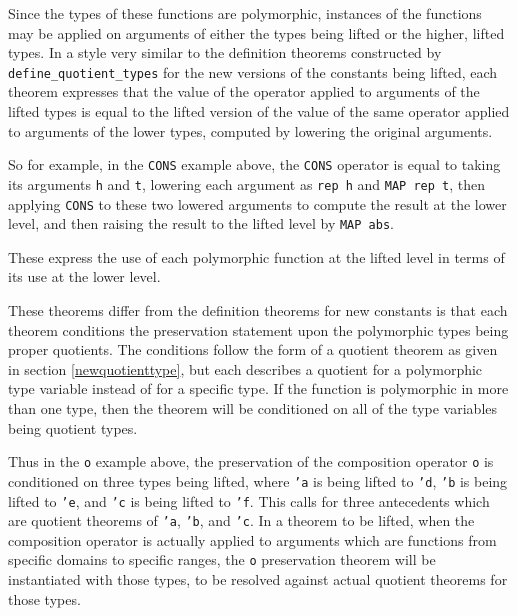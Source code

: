 \documentclass[envcountsame,runningheads]{llncs}
\begin{document}


Since the types of
these functions are polymorphic, instances of the functions may be applied 
on arguments of either the types being lifted or the higher, lifted types.
In a style very similar to the definition theorems constructed
by {\tt define\_quotient\_types} for the new versions of the 
constants being lifted, 
each theorem expresses that the value of
the operator applied to arguments of the lifted types
is equal to the lifted version of the value of the same operator
applied to arguments of the lower types,
computed by lowering the original arguments. 

So for example, in the {\tt CONS} example above,
the {\tt CONS} operator is equal to taking its arguments
{\tt h} and {\tt t}, lowering each argument as {\tt rep h} and {\tt MAP rep t},
then applying {\tt CONS} to these two lowered arguments to compute the
result at the lower level, and then raising the result to the lifted level
by {\tt MAP abs}.

These
express the use of each polymorphic function at the
lifted level in terms of its use at the lower level.

These theorems differ from
the definition theorems for new constants
is that each theorem conditions the preservation statement
upon the polymorphic types being 
proper quotients.  The conditions follow the form
of a quotient theorem as given in section \ref{newquotienttype},
but each describes a quotient for a polymorphic type variable
instead of for a specific type.  If the function is polymorphic in more
than one type, then the theorem will be conditioned on all of the
type variables being quotient types.  

Thus in the {\tt o} example above, the preservation
of the composition operator {\tt o}
is conditioned on three types being lifted,
where {\tt 'a} is being lifted to {\tt 'd},
{\tt 'b} is being lifted to {\tt 'e}, and
{\tt 'c} is being lifted to {\tt 'f}.
This calls for three antecedents which are quotient theorems of {\tt 'a}, 
{\tt 'b}, and {\tt 'c}.
In a theorem to be lifted, when
the composition operator is actually applied
to arguments which are functions from specific domains
to specific ranges, the {\tt o} preservation theorem will be
instantiated with those types,
to be resolved against actual quotient theorems for those types.
\end{document}
